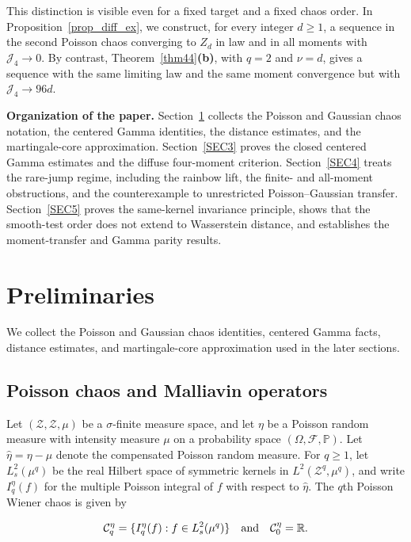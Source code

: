 \documentclass[letterpaper,11pt,reqno]{amsart}
\numberwithin{equation}{section}
\theoremstyle{plain}
\theoremstyle{definition}
\theoremstyle{remark}
\newcommand{\PP}{\mathbb{P}}
\newcommand{\R}{\mathbb{R}}
\newcommand{\cC}{\mathcal{C}}
\newcommand{\cF}{\mathcal{F}}
\newcommand{\cZ}{\mathcal{Z}}
\newcommand{\sZ}{\mathscr{Z}}
\newcommand{\noi}{\noindent}
\newcommand{\Jfour}{\mathcal J_4}
\newcommand{\s}{\sigma}
\newcommand{\AND}{\quad{\rm and}\quad}
\begin{document}
This distinction is visible even for a fixed target and a fixed chaos
order.  In Proposition~\ref{prop_diff_ex}, we construct, for every integer
$d\geq1$, a sequence in the second Poisson chaos converging to $Z_d$
in law and in all moments with $\Jfour\to0$.  By contrast,
Theorem~\ref{thm44}{\bf(b)}, with $q=2$ and $\nu=d$, gives a
sequence with the same limiting law and the same moment convergence
but with $\Jfour\to96d$.

\medskip
{\bf Organization of the paper.}
Section~\ref{SEC2} collects the Poisson and Gaussian chaos notation,
the centered Gamma identities, the distance estimates, and the
martingale-core approximation.  Section~\ref{SEC3} proves the closed
centered Gamma estimates and the diffuse four-moment criterion.
Section~\ref{SEC4} treats the rare-jump regime, including the rainbow
lift, the finite- and all-moment obstructions, and the counterexample
to unrestricted Poisson--Gaussian transfer.  Section~\ref{SEC5} proves
the same-kernel invariance principle, shows that the smooth-test order
does not extend to Wasserstein distance, and establishes the
moment-transfer and Gamma parity results.

\section{Preliminaries}
\label{SEC2}

We collect the Poisson and Gaussian chaos identities, centered Gamma
facts, distance estimates, and martingale-core approximation used in
the later sections.

\subsection{Poisson chaos and Malliavin operators}
\label{SEC_21}

Let $(\cZ,\sZ,\mu)$ be a $\s$-finite measure space,
and let $\eta$ be a
Poisson random measure with intensity measure $\mu$
on a probability space
$(\Omega,\cF,\PP)$.  Let $\widehat\eta=\eta-\mu$ denote
the compensated Poisson random measure.
For $q\geq1$,
let $L_s^2(\mu^q)$ be the real Hilbert space of symmetric kernels
in $L^2(\cZ^q, \mu^q)$, and write $I_q^\eta(f)$ for the multiple Poisson
integral of $f$ with respect to $\widehat\eta$.
The $q$th Poisson Wiener chaos is given by

\noi
\begin{align*}
 \cC_q^\eta=\{I_q^\eta(f):f\in L_s^2(\mu^q)\}
 \AND
 \cC_0^\eta=\R.
\end{align*}
\end{document}
